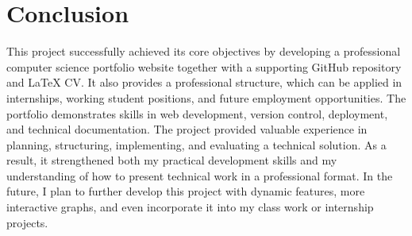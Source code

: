 \documentclass[12pt,a4paper]{article}
\begin{document}
\section{Conclusion}
This project successfully achieved its core objectives by developing a professional computer science portfolio website together with a supporting GitHub repository and LaTeX CV. It also provides a professional structure, which can be applied in internships, working student positions, and future employment opportunities.
The portfolio demonstrates skills in web development, version control, deployment, and technical documentation. The project provided valuable experience in planning, structuring, implementing, and evaluating a technical solution. As a result, it strengthened both my practical development skills and my understanding of how to present technical work in a professional format. In the future, I plan to further develop this project with dynamic features, more interactive graphs, and even incorporate it into my class work or internship projects.

\end{document}
